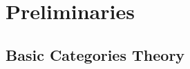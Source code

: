 \chapter{Preliminaries}

\addtocounter{section}{1}

\section{Basic Categories Theory}




\addtocounter{section}{1}






